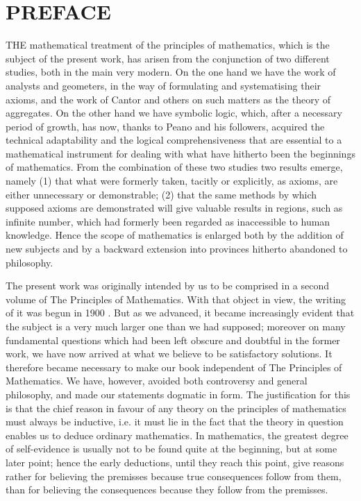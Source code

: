 \documentclass[10pt]{article}
\author{A. N. W.\\
B. R.}
\date{}
\begin{document}
\maketitle
\captionsetup{singlelinecheck=false}
\section*{PREFACE}
THE mathematical treatment of the principles of mathematics, which is the subject of the present work, has arisen from the conjunction of two different studies, both in the main very modern. On the one hand we have the work of analysts and geometers, in the way of formulating and systematising their axioms, and the work of Cantor and others on such matters as the theory of aggregates. On the other hand we have symbolic logic, which, after a necessary period of growth, has now, thanks to Peano and his followers, acquired the technical adaptability and the logical comprehensiveness that are essential to a mathematical instrument for dealing with what have hitherto been the beginnings of mathematics. From the combination of these two studies two results emerge, namely (1) that what were formerly taken, tacitly or explicitly, as axioms, are either unnecessary or demonstrable; (2) that the same methods by which supposed axioms are demonstrated will give valuable results in regions, such as infinite number, which had formerly been regarded as inaccessible to human knowledge. Hence the scope of mathematics is enlarged both by the addition of new subjects and by a backward extension into provinces hitherto abandoned to philosophy.

The present work was originally intended by us to be comprised in a second volume of The Principles of Mathematics. With that object in view, the writing of it was begun in 1900 . But as we advanced, it became increasingly evident that the subject is a very much larger one than we had supposed; moreover on many fundamental questions which had been left obscure and doubtful in the former work, we have now arrived at what we believe to be satisfactory solutions. It therefore became necessary to make our book independent of The Principles of Mathematics. We have, however, avoided both controversy and general philosophy, and made our statements dogmatic in form. The justification for this is that the chief reason in favour of any theory on the principles of mathematics must always be inductive, i.e. it must lie in the fact that the theory in question enables us to deduce ordinary mathematics. In mathematics, the greatest degree of self-evidence is usually not to be found quite at the beginning, but at some later point; hence the early deductions, until they reach this point, give reasons rather for believing the premisses because true consequences follow from them, than for believing the consequences because they follow from the premisses.
\end{document}
